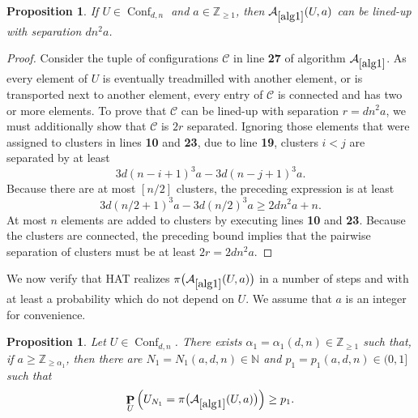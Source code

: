 \documentclass[11pt,reqno]{amsart}
\newtheorem{proposition}[lemma]{Proposition}
\theoremstyle{definition}
\numberwithin{equation}{section}
\newcommand{\N}{\mathbb{N}}
\newcommand{\Z}{\mathbb{Z}}
\newcommand{\1}{\mathbf{1}}
\DeclareMathOperator{\PP}{\mathbf{P}}
\newcommand{\CC}{\mathcal{C}}
\DeclareMathOperator{\Conf}{\mathrm{Conf}}
\begin{document}
\begin{proposition}\label{alg1 works}
If $U \in \Conf_{d,n}$ and $a \in \Z_{\geq 1}$, then $\mathcal{A}_{\ref{alg1}} (U,a)$ can be lined-up with separation $dn^2a$.
\end{proposition}

\begin{proof}
Consider the tuple of configurations $\CC$ in line {\bf 27} of algorithm $\mathcal{A}_{\ref{alg1}}$. As every element of $U$ is eventually treadmilled with another element, or is transported next to another element, every entry of $\CC$ is connected and has two or more elements. To prove that $\CC$ can be lined-up with separation $r = dn^2 a$, we must additionally show that $\CC$ is $2r$ separated. 
Ignoring those elements that were assigned to clusters in lines {\bf 10} and {\bf 23}, due to line {\bf 19}, clusters $i < j$ are separated by at least
\[ 3d(n-i+1)^3 a - 3d(n-j+1)^3 a.\]
Because there are at most $[n/2]$ clusters, the preceding expression is at least
\[ 3d(n/2+1)^3 a - 3d(n/2)^3 a \geq 2d n^2 a + n.\]
At most $n$ elements are added to clusters by executing lines {\bf 10} and {\bf 23}. Because the clusters are connected, the preceding bound implies that the pairwise separation of clusters must be at least $2r = 2dn^2a$.
\end{proof}


We now verify that HAT realizes $\pi \big( \mathcal{A}_{\ref{alg1}} (U,a) \big)$ in a number of steps and with at least a probability which do not depend on $U$. We assume that $a$ is an integer for convenience.

\begin{proposition}\label{follow alg1}
Let $U \in \Conf_{d,n}$. There exists $\alpha_1 = \alpha_1 (d,n) \in \Z_{\geq 1}$ such that, if $a \geq \Z_{\geq \alpha_1}$, then there are $N_1 = N_1 (a,d,n) \in \N$ and $p_1 = p_1 (a,d,n) \in (0,1]$ such that 
\begin{equation}\label{eq follow alg1}
\PP_U \Big( U_{N_1} = \pi \big( \mathcal{A}_{\ref{alg1}} (U,a) \big) \Big) \geq p_1.
\end{equation} 
\end{proposition}
\end{document}

